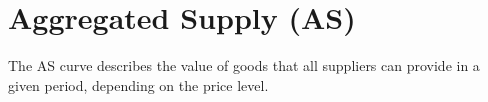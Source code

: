 
%

%



%







\pbn
\section{Aggregated Supply (AS)}
The AS curve describes the value of goods that all suppliers can provide in a given period, depending on the price level. 

